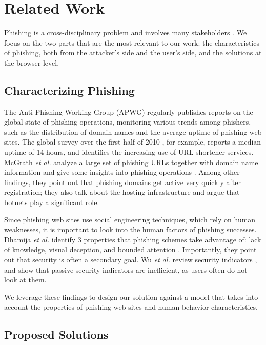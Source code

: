 \documentclass[11pt,styles/chicago,a4paper]{article}
\begin{document}
\section{Related Work} %

Phishing is a cross-disciplinary problem and involves many stakeholders \cite{sheng2009improving}. %
We focus on the two parts that are the most relevant to our work: the characteristics of phishing, both from the attacker's side and the user's side, and the solutions at the browser level.

\subsection{Characterizing Phishing}

The Anti-Phishing Working Group (APWG) regularly publishes reports on the global state of phishing operations, monitoring various trends among phishers, such as the distribution of domain names and the average uptime of phishing web sites. The global survey over the first half of 2010 \cite{apwg2010h1}, for example, reports a median uptime of 14 hours, and identifies the increasing use of URL shortener services. McGrath \emph{et al.} analyze a large set of phishing URLs together with domain name information and give some insights into phishing operations \cite{mcgrath2008behind}. Among other findings, they point out that phishing domains get active very quickly after registration; they also talk about the hosting infrastructure and argue that botnets play a significant role.

Since phishing web sites use social engineering techniques, which rely on human weaknesses, it is important to look into the human factors of phishing successes. Dhamija \emph{et al.} identify 3 properties that phishing schemes take advantage of: lack of knowledge, visual deception, and bounded attention \cite{dhamija2006why}. Importantly, they point out that security is often a secondary goal. Wu \emph{et al.} review security indicators \cite{wu2006security}, and show that passive security indicators are inefficient, as users often do not look at them.

We leverage these findings to design our solution against a model that takes into account the properties of phishing web sites and human behavior characteristics.

\subsection{Proposed Solutions}
\end{document}
